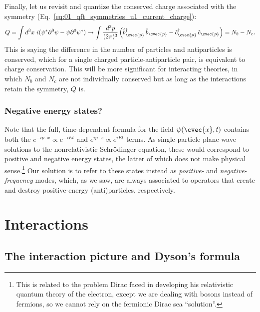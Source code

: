 Finally, let us revisit and quantize the conserved charge associated with the \UU[1] symmetry (Eq.~\ref{eq:01_qft_symmetries_u1_current_charge}):
\begin{equation}
    \label{eq:01_qft_quantization_complex_charge}
    Q = \int d^3x\ i(\psi^*\partial^0\psi - \psi\partial^0\psi^*) \rightarrow \int \frac{d^3p}{(2\pi)^3} \left(\hat b^\dagger_{\cvec{p}}\,\hat b_{\cvec{p}} - \hat c^\dagger_{\cvec{p}}\,\hat c_{\cvec{p}}\right) = N_b - N_c.
\end{equation}
This is saying the difference in the number of particles and antiparticles is conserved, which for a single charged particle-antiparticle pair, is equivalent to charge conservation.
This will be more significant for interacting theories, in which $N_b$ and $N_c$ are not individually conserved but as long as the interactions retain the \UU[1] symmetry, $Q$ is.

\subsubsection{Negative energy states?}

Note that the full, time-dependent formula for the field $\psi(\cvec{x}, t)$ contains both the $e^{-ip\cdot x}\propto e^{-iEt}$ and $e^{ip\cdot x}\propto e^{iEt}$ terms.
As single-particle plane-wave solutions to the nonrelativistic Schr\"odinger equation, these would correspond to positive and negative energy states, the latter of which does not make physical sense.\footnote{This is related to the problem Dirac faced in developing his relativistic quantum theory of the electron, except we are dealing with bosons instead of fermions, so we cannot rely on the fermionic Dirac sea ``solution''.}
Our solution is to refer to these states instead as \textit{positive-} and \textit{negative-frequency} modes, which, as we saw, are always associated to operators that create and destroy positive-energy (anti)particles, respectively.

\section{Interactions}
\label{app:01_qft_quantization_interactions}

\subsection{The interaction picture and Dyson's formula}
\label{sec:01_qft_quantization_interactions}

